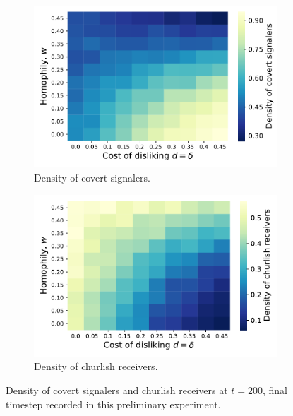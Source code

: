 \documentclass[11pt,letterpaper]{article}
\begin{document}
\begin{figure}[H]
  \centering
  \begin{subfigure}{0.49\textwidth}
    \centering
    \includegraphics[width=\textwidth]{prelim/Figures/covertDensityVsDislikingHomophilyCoevo.pdf}
    \caption{Density of covert signalers.}
  \end{subfigure}
  \begin{subfigure}{0.49\textwidth}
    \centering
    \includegraphics[width=\textwidth]{prelim/Figures/churlishDensityVsDislikingHomophilyCoevo.pdf}
    \caption{Density of churlish receivers.}
  \end{subfigure}
  
  \caption{Density of covert signalers and churlish receivers at $t=200$, 
    final timestep recorded in this preliminary experiment.}
  \label{fig:dislikingHomophilyHeatmap}
\end{figure}
\end{document}
